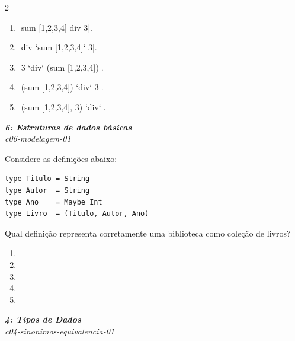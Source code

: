 \documentclass[a4paper,10pt,brazil]{article}
\begin{document}
\begin{multicols}{2}
\begin{enumerate}
  \item \haskellinline|sum [1,2,3,4] div 3|.

  \item \haskellinline|div `sum [1,2,3,4]` 3|.

  \item \haskellinline|3 `div` (sum [1,2,3,4])|.

  \item \haskellinline|(sum [1,2,3,4]) `div` 3|.

  \item \haskellinline|(sum [1,2,3,4], 3) `div`|.


\end{enumerate}

\begin{flushright}
  \footnotesize
  \textit{\textbf{6: Estruturas de dados básicas}}\\
  \textit{c06-modelagem-01}\\

\end{flushright}
Considere as definições abaixo:
\begin{verbatim}
type Titulo = String
type Autor  = String
type Ano    = Maybe Int
type Livro  = (Titulo, Autor, Ano)
\end{verbatim}
Qual definição representa corretamente uma biblioteca como coleção de livros?

\begin{enumerate}
  \item {}

  \item {}

  \item {}

  \item {}

  \item {}


\end{enumerate}

\begin{flushright}
  \footnotesize
  \textit{\textbf{4: Tipos de Dados}}\\
  \textit{c04-sinonimos-equivalencia-01}\\


\end{flushright}
\end{multicols}
\end{document}
